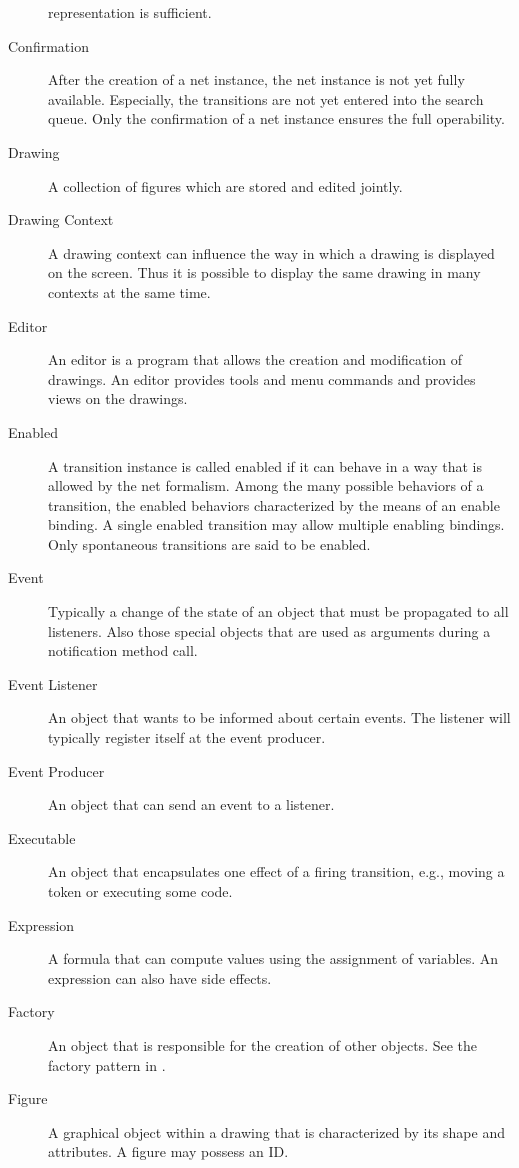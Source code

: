 \begin{description}
  representation is sufficient.
\item[Confirmation] After the creation of a \see net instance,
  the \see net instance is not yet fully available. Especially,
  the transitions are not yet entered into the \see search queue.
  Only the confirmation of a \see net instance ensures the
  full operability.
\item[Drawing] A collection of \see figures which are stored and
  edited jointly.
\item[Drawing Context] A drawing context can influence the way in which
  a \see drawing is displayed on the screen. Thus it is possible to
  display the same drawing in many contexts at the same time.
\item[Editor] An editor is a program that allows the creation and
  modification of \see drawings. An editor provides \see tools
  and menu commands and provides \see views on the drawings.
\item[Enabled] A \see transition instance is called enabled if it can behave
  in a way that is allowed by the \see net formalism. Among the many 
  possible behaviors of a \see transition, the enabled behaviors
  characterized by the means of an enable binding. A single enabled 
  \see transition may allow multiple enabling \see bindings.
  Only \see spontaneous transitions are said to be enabled.
\item[Event] Typically a change of the state of an object that must
  be propagated to all \see listeners. Also those special objects 
  that are used as arguments during a notification method call.
\item[Event Listener] An object that wants to be informed about
  certain \see events. The listener will typically register itself
  at the \see event producer.
\item[Event Producer] An object that can send an \see event to a
  \see listener.
\item[Executable] An object that encapsulates one effect of
  a firing transition, e.g., moving a token or executing some code.
\item[Expression] A formula that can compute values using the assignment
  of variables. An expression can also have side effects.
\item[Factory] An object that is responsible for the creation
  of other objects. See the factory pattern in \cite{Gamma95}.
\item[Figure] A graphical object within a \see drawing that is characterized
  by its shape and \see attri\-butes. A figure may possess an \see ID.

\end{description}
